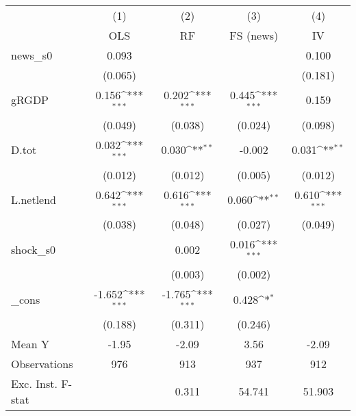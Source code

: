 {
\def\sym#1{\ifmmode^{#1}\else\(^{#1}\)\fi}
\begin{tabular}{l*{4}{c}}
\toprule
            &\multicolumn{1}{c}{(1)}&\multicolumn{1}{c}{(2)}&\multicolumn{1}{c}{(3)}&\multicolumn{1}{c}{(4)}\\
            &\multicolumn{1}{c}{OLS}&\multicolumn{1}{c}{RF}&\multicolumn{1}{c}{FS (news)}&\multicolumn{1}{c}{IV}\\
\midrule
news\_s0     &       0.093         &                     &                     &       0.100         \\
            &     (0.065)         &                     &                     &     (0.181)         \\
\addlinespace
gRGDP       &       0.156\sym{***}&       0.202\sym{***}&       0.445\sym{***}&       0.159         \\
            &     (0.049)         &     (0.038)         &     (0.024)         &     (0.098)         \\
\addlinespace
D.tot       &       0.032\sym{***}&       0.030\sym{**} &      -0.002         &       0.031\sym{**} \\
            &     (0.012)         &     (0.012)         &     (0.005)         &     (0.012)         \\
\addlinespace
L.netlend   &       0.642\sym{***}&       0.616\sym{***}&       0.060\sym{**} &       0.610\sym{***}\\
            &     (0.038)         &     (0.048)         &     (0.027)         &     (0.049)         \\
\addlinespace
shock\_s0    &                     &       0.002         &       0.016\sym{***}&                     \\
            &                     &     (0.003)         &     (0.002)         &                     \\
\addlinespace
\_cons      &      -1.652\sym{***}&      -1.765\sym{***}&       0.428\sym{*}  &                     \\
            &     (0.188)         &     (0.311)         &     (0.246)         &                     \\
\midrule
Mean Y      &       -1.95         &       -2.09         &        3.56         &       -2.09         \\
Observations&         976         &         913         &         937         &         912         \\
Exc. Inst. F-stat&                     &       0.311         &      54.741         &      51.903         \\
\bottomrule
\end{tabular}
}
